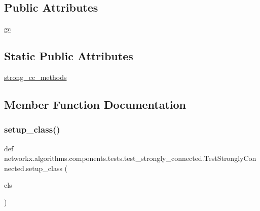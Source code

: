 \subsection*{Public Attributes}
\begin{DoxyCompactItemize}
\item 
\hyperlink{classnetworkx_1_1algorithms_1_1components_1_1tests_1_1test__strongly__connected_1_1TestStronglyConnected_a727cee9599282a455c448311000ac861}{gc}
\end{DoxyCompactItemize}
\subsection*{Static Public Attributes}
\begin{DoxyCompactItemize}
\item 
\hyperlink{classnetworkx_1_1algorithms_1_1components_1_1tests_1_1test__strongly__connected_1_1TestStronglyConnected_ac993b54c3f1ed053f491d5b1adce8758}{strong\+\_\+cc\+\_\+methods}
\end{DoxyCompactItemize}


\subsection{Member Function Documentation}
\mbox{\label{classnetworkx_1_1algorithms_1_1components_1_1tests_1_1test__strongly__connected_1_1TestStronglyConnected_a9e6b35c4bcb30e67be1339b932ceb327}} 
\subsubsection{\texorpdfstring{setup\+\_\+class()}{setup\_class()}}
{\footnotesize\ttfamily def networkx.\+algorithms.\+components.\+tests.\+test\+\_\+strongly\+\_\+connected.\+Test\+Strongly\+Connected.\+setup\+\_\+class (\begin{DoxyParamCaption}\item[{}]{cls }\end{DoxyParamCaption})}

